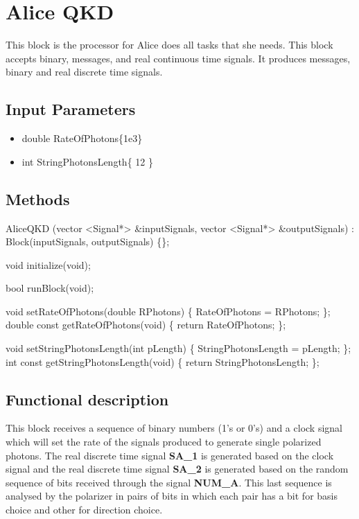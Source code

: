 \clearpage

\section{Alice QKD}

\maketitle
This block is the processor for Alice does all tasks that she needs. This block accepts binary, messages, and real continuous time signals. It produces messages, binary and real discrete time signals.


\subsection*{Input Parameters}

	\begin{itemize}
		\item double RateOfPhotons\{1e3\}
	
		\item int StringPhotonsLength\{ 12 \}
	\end{itemize}

\subsection*{Methods}
    AliceQKD (vector <Signal*> \&inputSignals, vector <Signal*> \&outputSignals) : Block(inputSignals, outputSignals) \{\};

	void initialize(void);

	bool runBlock(void);

	void setRateOfPhotons(double RPhotons) \{ RateOfPhotons = RPhotons; \};
	double const getRateOfPhotons(void) \{ return RateOfPhotons; \};

	void setStringPhotonsLength(int pLength) \{ StringPhotonsLength = pLength; \};
	int const getStringPhotonsLength(void) \{ return StringPhotonsLength; \};


\subsection*{Functional description}

This block receives a sequence of binary numbers (1's or 0's) and a clock signal which will set the rate of the signals produced to generate single polarized photons. The real discrete time signal \textbf{SA\_1} is generated based on the clock signal and the real discrete time signal \textbf{SA\_2} is generated based on the random sequence of bits received through the signal \textbf{NUM\_A}. This last sequence is analysed by the polarizer in pairs of bits in which each pair has a bit for basis choice and other for direction choice.

